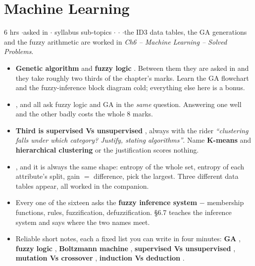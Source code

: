 \section{Machine Learning}

{\color{sub}\footnotesize 6 hrs \gap$\cdot$\gap asked in 
\gap$\cdot$ syllabus sub-topics \gap$\cdot$\gap {} \gap$\cdot$\gap {} \gap$\cdot$\gap the ID3 data tables, the GA generations and the fuzzy
arithmetic are worked in \emph{Ch6 -- Machine Learning -- Solved Problems}.}

\begin{itemize}
  \item {}
        \textbf{Genetic algorithm}  and \textbf{fuzzy logic} . Between
        them they are asked in  and they take
        roughly two thirds of the chapter's marks. Learn the GA flowchart and the
        fuzzy-inference block diagram cold; everything else here is a bonus.
  \item {} ,
         and  all ask fuzzy logic and GA in
        the \emph{same} question. Answering one well and the other badly costs the
        whole 8 marks.
  \item \textbf{Third is supervised Vs unsupervised} , always with the rider
        \emph{``clustering falls under which category? Justify, stating algorithms''}.
        Name \textbf{K-means} and \textbf{hierarchical clustering} or the justification
        scores nothing.
  \item {} , and
        it is always the same shape: entropy of the whole set, entropy of each
        attribute's split, gain $=$ difference, pick the largest. Three different data
        tables appear, all worked in the companion.
  \item {} Every one of the sixteen asks the \textbf{fuzzy inference
        system} $-$ membership functions, rules, fuzzification, defuzzification. \S6.7
        teaches the inference system and says where the two names meet.
  \item Reliable short notes, each a fixed list you can write in four minutes:
        \textbf{GA} , \textbf{fuzzy logic} ,
        \textbf{Boltzmann machine} , \textbf{supervised Vs unsupervised} ,
        \textbf{mutation Vs crossover} , \textbf{induction Vs deduction} .
\end{itemize}

